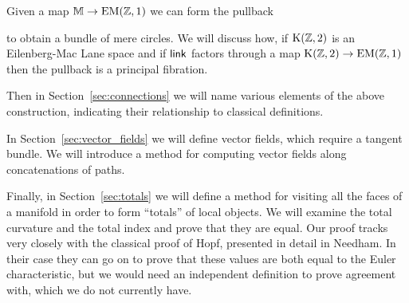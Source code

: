 Given a map \( \mathbb{M}\to\mathrm{EM}(\mathbb{Z},1) \) we can form the pullback
\begin{center}
\end{center}
to obtain a bundle of mere circles. We will discuss how, if \( \mathrm{K}(\mathbb{Z},2) \) is an Eilenberg-Mac Lane space and if \( \operatorname{\mathsf{link}} \) factors through a map \( \mathrm{K}(\mathbb{Z},2)\to\mathrm{EM}(\mathbb{Z},1) \) then the pullback is a principal fibration.

Then in Section~\ref{sec:connections} we will name various elements of the above construction, indicating their relationship to classical definitions.

In Section~\ref{sec:vector_fields} we will define vector fields, which require a tangent bundle. We will introduce a method for computing vector fields along concatenations of paths.

Finally, in Section~\ref{sec:totals} we will define a method for visiting all the faces of a manifold in order to form ``totals'' of local objects. We will examine the total curvature and the total index and prove that they are equal. Our proof tracks very closely with the classical proof of Hopf\cite{hopf}, presented in detail in Needham\cite{needham}. In their case they can go on to prove that these values are both equal to the Euler characteristic, but we would need an independent definition to prove agreement with, which we do not currently have.

